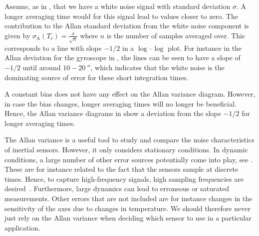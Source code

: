 Assume, as in , that we have a white noise signal with standard deviation $\sigma$. A longer averaging time would for this signal lead to values closer to zero. The contribution to the Allan standard deviation from the white noise component is given by $\sigma_\text{A}(T_c) = \tfrac{\sigma}{\sqrt{n}}$ where $n$ is the number of samples averaged over. This corresponds to a line with slope $-1/2$ in a $\log$--$\log$ plot. For instance in the Allan deviation for the gyroscope in , the lines can be seen to have a slope of $-1/2$ until around $10-20~\second$, which indicates that the white noise is the dominating source of error for these short integration times. 

A constant bias does not have any effect on the Allan variance diagram. However, in case the bias changes, longer averaging times will no longer be beneficial. Hence, the Allan variance diagrams in  show a deviation from the slope $-1/2$ for longer averaging times. 

The Allan variance is a useful tool to study and compare the noise characteristics of inertial sensors. However, it only considers stationary conditions. In dynamic conditions, a large number of other error sources potentially come into play, see \eg \cite{tittertonW:1997,woodman:2007}. These are for instance related to the fact that the sensors sample at discrete times. Hence, to capture high-frequency signals, high sampling frequencies are desired~\citep{savage:1998a,savage:1998b}. Furthermore, large dynamics can lead to erroneous or saturated measurements. Other errors that are not included are for instance changes in the sensitivity of the axes due to changes in temperature. We should therefore never just rely on the Allan variance when deciding which sensor to use in a particular application.
